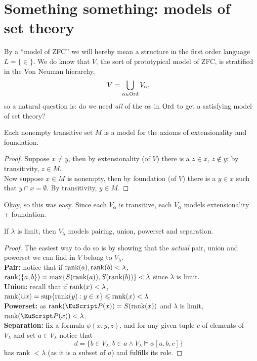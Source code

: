 \documentclass[twoside,openright,titlepage,numbers=noenddot,%
               headinclude,footinclude,cleardoublepage=empty,abstract=on,
               BCOR=23mm,paper=letter,fontsize=11pt
               ]{scrreprt}
\begin{document}
\chapter[Models of set theory]{Something something: models of set theory}
By a ``model of ZFC'' we will hereby mean a structure in the first order language $L= \{\in\}$. We do know that $V$, the sort of prototypical model of ZFC, is stratified in the Von Neuman hierarchy,
\[ V = \bigcup_{\alpha \in \mathrm{Ord}} V_\alpha, \]
so a natural question is: do we need \textit{all} of the $\alpha$s in $\mathrm{Ord}$ to get a satisfying model of set theory?
\begin{proposition}
    Each nonempty transitive set $M$ is a model for the axioms of extensionality and foundation.
\end{proposition}
\begin{proof}
    Suppose $x \neq y$, then by extensionality (of $V$) there is a $z \in x$, $z \notin y$: by transitivity, $z \in M$. \\
    Now suppose $x \in M$ is nonempty, then by foundation (of $V$) there is a $y \in x$ such that $y \cap x = \emptyset$. By transitivity, $y \in M$.
\end{proof}
Okay, so this was easy. Since each $V_\alpha$ is transitive, each $V_\alpha$ models extensionality + foundation.
\begin{theorem}
    If $\lambda$ is limit, then $V_\lambda$ models pairing, union, powerset and separation.
\end{theorem}
\begin{proof}
    The easiest way to do so is by showing that the \textit{actual} pair, union and powerset we can find in $V$ belong to $V_\lambda$. \\
    \textbf{Pair:} notice that if $\mathrm{rank}(a), \mathrm{rank}(b) < \lambda$, $\mathrm{rank}(\{a,b\}) = \max\{S(\mathrm{rank}(a)), S(\mathrm{rank}(b))\} < \lambda$ since $\lambda$ is limit. \\
    \textbf{Union:} recall that if $\mathrm{rank}(x) < \lambda$, $\mathrm{rank}(\cup x) = \sup\{\mathrm{rank}(y): y \in x\} \leqslant \mathrm{rank}(x) < \lambda$. \\
    \textbf{Powerset:} as $\rank(\P(x)) = S(\rank(x))$ and $\lambda$ is limit, $\rank(\P(x)) < \lambda$. \\
    \textbf{Separation:} fix a formula $\phi(x,y,z)$, and for any given tuple $c$ of elements of $V_\lambda$ and set $a \in V_\lambda$ notice that 
    \[ d = \{b \in V_\lambda: b \in a \land V_\lambda \models \phi[a,b,c]\} \]
    has rank $< \lambda$ (as it is a subset of $a$) and fulfills its role.
\end{proof}
\end{document}
